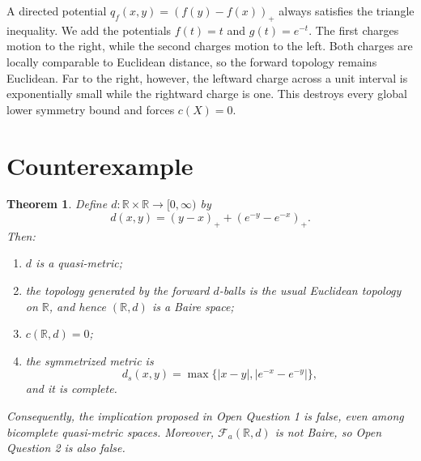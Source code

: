 \documentclass[11pt]{article}
\newtheorem{theorem}{Theorem}
\newcommand{\R}{\mathbb R}
\newcommand{\Fa}{\mathcal F_a}
\newcommand{\pos}[1]{\left(#1\right)_+}
\begin{document}
A directed potential $q_f(x,y)=(f(y)-f(x))_+$ always satisfies the triangle
inequality. We add the potentials $f(t)=t$ and $g(t)=e^{-t}$. The first
charges motion to the right, while the second charges motion to the left.
Both charges are locally comparable to Euclidean distance, so the forward
topology remains Euclidean. Far to the right, however, the leftward charge
across a unit interval is exponentially small while the rightward charge is
one. This destroys every global lower symmetry bound and forces $c(X)=0$.

\section*{Counterexample}

\begin{theorem}\label{thm:main}
Define $d:\R\times\R\to[0,\infty)$ by
\[
 d(x,y)=\pos{y-x}+\pos{e^{-y}-e^{-x}}.
\]
Then:
\begin{enumerate}
\item $d$ is a quasi-metric;
\item the topology generated by the forward $d$-balls is the usual
Euclidean topology on \(\R\), and hence \((\R,d)\) is a Baire space;
\item $c(\R,d)=0$;
\item the symmetrized metric is
\[
 d_s(x,y)=\max\{|x-y|,|e^{-x}-e^{-y}|\},
\]
and it is complete.
\end{enumerate}
Consequently, the implication proposed in Open Question 1 is false, even
among bicomplete quasi-metric spaces. Moreover, \(\Fa(\R,d)\) is not Baire,
so Open Question 2 is also false.
\end{theorem}
\end{document}
